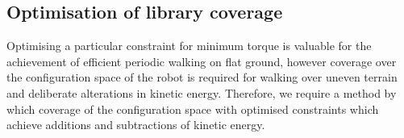 \subsection{Optimisation of library coverage}
Optimising a particular constraint for minimum torque is valuable for the achievement of efficient periodic walking on flat ground, however coverage over the configuration space of the robot is required for walking over uneven terrain and deliberate alterations in kinetic energy. Therefore, we require a method by which coverage of the configuration space with optimised constraints which achieve additions and subtractions of kinetic energy.